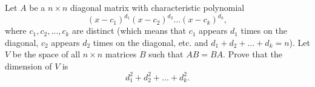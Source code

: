 \documentclass{article}
\begin{document}
	\setlength{\parindent}{0pt}
	Let $A$ be a $n \times  n$ diagonal matrix with characteristic polynomial $$(x - c_1)^{d_1}(x- c_2)^{d_2}\dots(x - c_k)^{d_k},$$ where $c_1, c_2, \dots , c_k$ are distinct (which means that $c_1$ appears $d_1$ times on the
	diagonal, $c_2$ appears $d_2$ times on the diagonal, etc. and $d_1+d_2+\dots+d_k = n$). Let $V$ be the space of all $n \times n$ matrices $B$ such that $AB = BA$. Prove that the dimension of $V$ is $$d_1^2+d_2^2+\dots+d_k^2.$$
\end{document}
